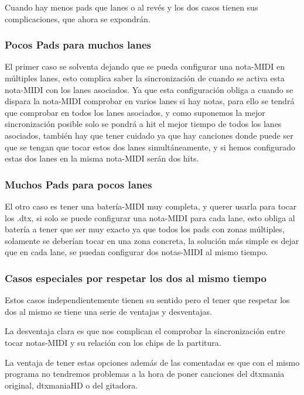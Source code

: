 \documentclass[a4paper,11pt,oneside]{book}
\begin{document}
Cuando hay menos pads que lanes o al revés y los dos casos tienen sus complicaciones, que ahora se expondrán.
 
\subsubsection{Pocos Pads para muchos lanes} 
El primer caso se solventa dejando que se pueda configurar una nota-MIDI en múltiples lanes, esto complica saber la sincronización de cuando se activa esta nota-MIDI con los lanes asociados.
Ya que esta configuración obliga a cuando se dispara la nota-MIDI comprobar en varios lanes si hay notas, para ello se tendrá que comprobar en todos los lanes asociados, y como suponemos la mejor sincronización posible solo se pondrá a hit el mejor tiempo de todos los lanes asociados, también hay que tener cuidado ya que hay canciones donde puede ser que se tengan que tocar estos dos lanes simultáneamente, y si hemos configurado estas dos lanes en la misma nota-MIDI serán dos hits.

\subsubsection{Muchos Pads para pocos lanes}

El otro caso es tener una batería-MIDI muy completa, y querer usarla para tocar los .dtx, si solo se puede configurar una nota-MIDI para cada lane, esto obliga al batería a tener que ser muy exacto ya que todos los pads con zonas múltiples, solamente se deberían tocar en una zona concreta, la solución más simple es dejar que en cada lane, se puedan configurar dos notas-MIDI al mismo tiempo.

\subsubsection{Casos especiales por respetar los dos al mismo tiempo}

Estos casos independientemente tienen su sentido pero el tener que respetar los dos al mismo se tiene una serie de ventajas y desventajas.

La desventaja clara es que nos complican el comprobar la sincronización entre tocar notas-MIDI y su relación con los chips de la partitura.

La ventaja de tener estas opciones además de las comentadas es que con el mismo programa no tendremos problemas a la hora de poner canciones del dtxmania original, dtxmaniaHD o del gitadora.
\end{document}
